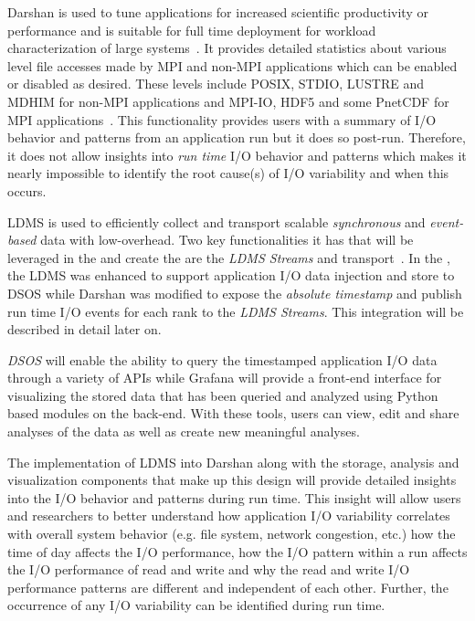 \documentclass[conference]{IEEEtran}
\begin{document}
Darshan is used to tune applications for increased scientific productivity or performance and is suitable for full time deployment for workload characterization of large systems~\cite{darshan-webpage}. It provides detailed statistics about various level file accesses made by MPI and non-MPI applications which can be enabled or disabled as desired. These levels include POSIX, STDIO, LUSTRE and MDHIM for non-MPI applications and MPI-IO, HDF5 and some PnetCDF for MPI applications~\cite{darshan-runtime}. This functionality provides users with a summary of I/O behavior and patterns from an application run but it does so post-run. Therefore, it does not allow insights into \emph{run time} I/O behavior and patterns which makes it nearly impossible to identify the root cause(s) of I/O variability and when this occurs. 

LDMS is used to efficiently collect and transport scalable \emph{synchronous} and \emph{event-based} data with low-overhead. Two key functionalities it has that will be leveraged in the \Darshan and create the \connector are the \emph{LDMS Streams} and transport~\cite{ldmsgithub}. In the \Darshan, the LDMS was enhanced to support application I/O data injection and store to DSOS while Darshan was modified to expose the \emph{absolute timestamp} and publish run time I/O events for each rank to the \emph{LDMS Streams}. This integration will be described in detail later on.   


\emph{DSOS} will enable the ability to query the timestamped application I/O data through a variety of APIs while Grafana will provide a front-end interface for visualizing the stored data that has been queried and analyzed using Python based modules on the back-end. With these tools, users can view, edit and share analyses of the data as well as create new meaningful analyses. 

The implementation of LDMS into Darshan along with the storage, analysis and visualization components that make up this design will provide detailed insights into the I/O behavior and patterns during run time. This insight will allow users and researchers to better understand how application I/O variability correlates with overall system behavior (e.g. file system, network congestion, etc.) how the time of day affects the I/O performance, how the I/O pattern within a run affects the I/O performance of read and write and why the read and write I/O performance patterns are different and independent of each other. Further, the occurrence of any I/O variability can be identified during run time.
\end{document}
